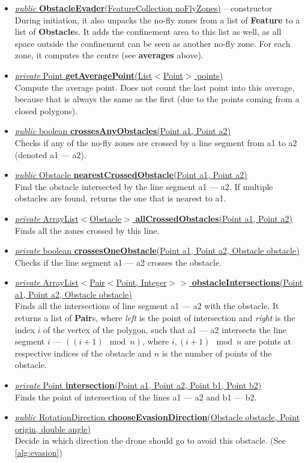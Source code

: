 \documentclass{article}
\newcommand{\method}[4]{\underline{\textit{#1} #2 \textbf{#3}(#4)}}
\begin{document}
\begin{itemize}
\item \underline{\textit{public} \textbf{ObstacleEvader}(FeatureCollection noFlyZones)} -- constructor \\
  During initiation, it also unpacks the no-fly zones from a list of \textbf{Feature} to a list of \textbf{Obstacle}s. It adds the confinement area to this list as well, as all space outside the confinement can be seen as another no-fly zone. For each zone, it computes the centre (see \textbf{averages} above).
\item \method{private}{Point}{getAveragePoint}{List$<$Point$>$ points} \\
  Compute the average point. Does not count the last point into this average, because that is always the same as the first (due to the points coming from a closed polygons).
\item \method{public}{boolean}{crossesAnyObstacles}{Point a1, Point a2} \\
  Checks if any of the no-fly zones are crossed by a line segment from a1 to a2 (denoted a1 --- a2).
\item \method{public}{Obstacle}{nearestCrossedObstacle}{Point a1, Point a2} \\
  Find the obstacle intersected by the line segment a1 --- a2. If multiple obstacles are found, returns the one that is nearest to a1.
\item \method{private}{ArrayList$<$Obstacle$>$}{allCrossedObstacles}{Point a1, Point a2} \\
  Finds all the zones crossed by this line.
\item \method{private}{boolean}{crossesOneObstacle}{Point a1, Point a2, Obstacle obstacle} \\
  Checks if the line segment a1 --- a2 crosses the obstacle.
\item \method{private}{ArrayList$<$Pair$<$Point, Integer$>>$}{obstacleIntersections}{Point a1, Point a2, Obstacle obstacle} \\
  Finds all the intersections of line segment a1 --- a2 with the obstacle. It returns a list of \textbf{Pair}s, where \textit{left} is the point of intersection and \textit{right} is the index $i$ of the vertex of the polygon, such that a1 --- a2 intersects the line segment $i$ --- $((i + 1) \mod n)$, where $i, (i+1)\mod n$ are points at respective indices of the obstacle and $n$ is the number of points of the obstacle.
\item \method{private}{Point}{intersection}{Point a1, Point a2, Point b1, Point b2} \\
  Finds the point of intersection of the lines a1 --- a2 and b1 --- b2.
\item \method{public}{RotationDirection}{chooseEvasionDirection}{Obstacle obstacle, Point origin, double angle} \\
  Decide in which direction the drone should go to avoid this obstacle. (See \ref{alg:evasion})
\end{itemize}
\end{document}
